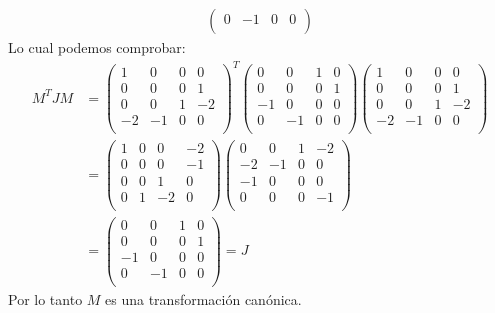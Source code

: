 \documentclass[a4paper]{article}
\begin{document}
\begin{answer}[Punto 19]
\begin{align*}
\begin{pmatrix}
                0 & -1 & 0 & 0\\
            \end{pmatrix}
        \end{align*}
        Lo cual podemos comprobar:
        \begin{align*}
            M^T J M &= \begin{pmatrix}
                1 & 0 & 0 & 0\\
                0 & 0 & 0 & 1\\
                0 & 0 & 1 & -2\\
                -2 & -1 & 0 & 0\\
            \end{pmatrix}^T \begin{pmatrix}
                0 & 0 & 1 & 0\\
                0 & 0 & 0 & 1\\
                -1 & 0 & 0 & 0\\
                0 & -1 & 0 & 0\\
            \end{pmatrix} \begin{pmatrix}
                1 & 0 & 0 & 0\\
                0 & 0 & 0& 1\\
                0 & 0 & 1 & -2\\
                -2 & -1 & 0 & 0\\
            \end{pmatrix} \\
            &= \begin{pmatrix}
                1 & 0 & 0 & -2\\
                0 & 0 & 0 & -1\\
                0 & 0 & 1 & 0\\
                0 & 1 & -2 & 0\\
            \end{pmatrix} \begin{pmatrix}
                0 & 0 & 1 & -2\\
                -2 & -1 & 0 & 0\\
                -1 & 0 & 0 & 0\\
                0 & 0& 0& -1\\
            \end{pmatrix} \\
            &= \begin{pmatrix}
                0 & 0 & 1 & 0\\
                0 & 0 & 0 & 1\\
                -1 & 0 & 0 & 0\\
                0 & -1& 0 & 0\\
            \end{pmatrix} = J
        \end{align*}
        Por lo tanto $M$ es una transformación canónica.
    

\end{answer}
\end{document}
